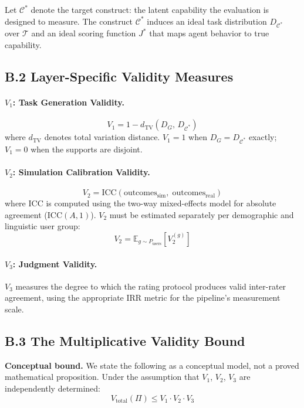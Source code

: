 \documentclass[preprint,12pt]{elsarticle}
\newcommand{\vtot}{V_{\text{total}}}
\newcommand{\cone}{V_1}
\newcommand{\ctwo}{V_2}
\newcommand{\cthree}{V_3}
\begin{document}
Let $\mathcal{C}^*$ denote the target construct: the latent capability the
evaluation is designed to measure. The construct $\mathcal{C}^*$ induces an ideal
task distribution $D_{\mathcal{C}^*}$ over $\mathcal{T}$ and an ideal scoring
function $J^*$ that maps agent behavior to true capability.

\subsection*{B.2 Layer-Specific Validity Measures}

\paragraph{$\cone$: Task Generation Validity.}
\[
  \cone = 1 - d_{\mathrm{TV}}(D_G,\, D_{\mathcal{C}^*})
\]
where $d_{\mathrm{TV}}$ denotes total variation distance. $\cone = 1$ when
$D_G = D_{\mathcal{C}^*}$ exactly; $\cone = 0$ when the supports are disjoint.

\paragraph{$\ctwo$: Simulation Calibration Validity.}
\[
  \ctwo = \mathrm{ICC}(\text{outcomes}_{\mathrm{sim}},\;
                         \text{outcomes}_{\mathrm{real}})
\]
where ICC is computed using the two-way mixed-effects model for absolute agreement
($\mathrm{ICC}(A,1)$). $\ctwo$ must be estimated separately per demographic and
linguistic user group:
\[
  \ctwo = \mathbb{E}_{g \sim P_{\mathrm{users}}}[\ctwo^{(g)}]
\]

\paragraph{$\cthree$: Judgment Validity.}
$\cthree$ measures the degree to which the rating protocol produces valid
inter-rater agreement, using the appropriate IRR metric for the pipeline's
measurement scale.

\subsection*{B.3 The Multiplicative Validity Bound}

\textbf{Conceptual bound.} We state the following as a conceptual model, not a
proved mathematical proposition. Under the assumption that $\cone$, $\ctwo$,
$\cthree$ are independently determined:
\[
  \vtot(\Pi) \leq \cone \cdot \ctwo \cdot \cthree
\]
\end{document}
